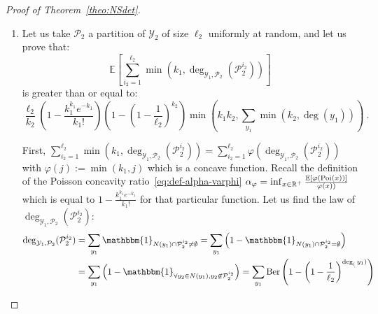 \begin{proof}[Proof of Theorem~\ref{theo:NSdet}]
\begin{enumerate}
However the function $f : x \mapsto 1-\left(1-\frac{1}{\ell_1}\right)^x$ is nondecreasing concave with $f(0)=0$, so $\frac{f(x)}{x} \geq \frac{f(y)}{y}$ for $x \leq y$. In particular, we have that:
\[ f(\min(k_1,\deg_{\mathcal{Y}_1,\mathcal{P}_2}(\mathcal{P}_2^{i_2}))) \geq \frac{\min(k_1,\deg_{\mathcal{Y}_1,\mathcal{P}_2}(\mathcal{P}_2^{i_2})))}{k_1}f(k_1) \ , \]
and thus:
\begin{equation}
  \begin{aligned}
    \mathbb{E}_{\mathcal{P}_1}[e_{G_W}(\mathcal{P}_1,\mathcal{P}_2)] &\geq \ell_1\sum_{i_2=1}^{\ell_2}\left(1-\left(1-\frac{1}{\ell_1}\right)^{\min(k_1,\deg_{\mathcal{Y}_1,\mathcal{P}_2}(\mathcal{P}_2^{i_2}))}\right)\\
    &\geq \ell_1\frac{\sum_{i_2=1}^{\ell_2}\min(k_1,\deg_{\mathcal{Y}_1,\mathcal{P}_2}(\mathcal{P}_2^{i_2}))}{k_1}\left(1-\left(1-\frac{1}{\ell_1}\right)^{k_1}\right)\\
    &= \frac{\ell_1}{k_1}\left(1-\left(1-\frac{1}{\ell_1}\right)^{k_1}\right)\sum_{i_2=1}^{\ell_2}\min\left(k_1,\deg_{\mathcal{Y}_1,\mathcal{P}_2}(\mathcal{P}_2^{i_2})\right) \ ,
  \end{aligned}
\end{equation} 
which concludes the first part of the proof.
  
\item Let us take $\mathcal{P}_2$ a partition of $\mathcal{Y}_2$ of size $\ell_2$ uniformly at random, and let us prove that:
  \[ \mathbb{E}\left[\sum_{i_2=1}^{\ell_2}\min\left(k_1,\deg_{\mathcal{Y}_1,\mathcal{P}_2}(\mathcal{P}_2^{i_2})\right)\right] \]
  is greater than or equal to:
  \[ \frac{\ell_2}{k_2}\left(1 - \frac{k_1^{k_1}e^{-k_1}}{k_1!}\right)\left(1-\left(1-\frac{1}{\ell_2}\right)^{k_2}\right)\min\left(k_1k_2,\sum_{y_1}\min(k_2,\deg(y_1))\right) \ . \]

  First, $\sum_{i_2=1}^{\ell_2}\min\left(k_1,\deg_{\mathcal{Y}_1,\mathcal{P}_2}(\mathcal{P}_2^{i_2})\right) = \sum_{i_2=1}^{\ell_2}\varphi(\deg_{\mathcal{Y}_1,\mathcal{P}_2}(\mathcal{P}_2^{i_2}))$ with $\varphi(j):=\min(k_1,j)$ which is a concave function. Recall the definition of the Poisson concavity ratio~\ref{eq:def-alpha-varphi} $\alpha_{\varphi} = \inf_{x \in \mathbb{R}^+} \frac{\mathbb{E}[\varphi(\operatorname{\text{Poi}}(x))]}{\varphi(x))}$ which is equal to $1 - \frac{k_1^{k_1}e^{-k_1}}{k_1!}$ for that particular function. Let us find the law of $\deg_{\mathcal{Y}_1,\mathcal{P}_2}(\mathcal{P}_2^{i_2})$:
  \begin{equation}
    \begin{aligned}
      \deg_{\mathcal{Y}_1,\mathcal{P}_2}(\mathcal{P}_2^{i_2}) &= \sum_{y_1} \mathbbm{1}_{N(y_1) \cap \mathcal{P}_2^{i_2} \not= \emptyset} = \sum_{y_1} \left(1-\mathbbm{1}_{N(y_1) \cap \mathcal{P}_2^{i_2} = \emptyset}\right)\\
      &= \sum_{y_1} \left(1-\mathbbm{1}_{\forall y_2 \in N(y_1), y_2 \not\in \mathcal{P}_2^{i_2}}\right) = \sum_{y_1} \Ber\left(1-\left(1-\frac{1}{\ell_2}\right)^{\deg_(y_1)}\right)
    \end{aligned}
  \end{equation}


\end{enumerate}
\end{proof}
